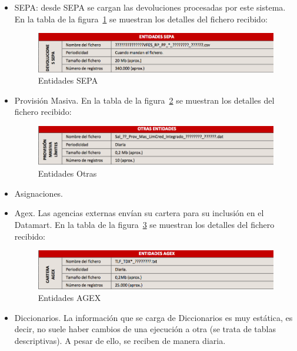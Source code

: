 \documentclass[a4paper, 12pt]{book}
\begin{document}
\begin{itemize}
	\item SEPA: desde SEPA se cargan las devoluciones procesadas por este sistema. En la tabla de la figura~\ref{fig:entidades9} se muestran los detalles del fichero recibido:

	\begin{figure}
	  \centering
	  \includegraphics[width=14cm, keepaspectratio]{img/entidades9}
	  \caption{Entidades SEPA}
	  \label{fig:entidades9}
	\end{figure}
	
	\item Provisión Masiva. En la tabla de la figura~\ref{fig:entidades10} se muestran los detalles del fichero recibido:

	\begin{figure}
	  \centering
	  \includegraphics[width=14cm, keepaspectratio]{img/entidades10}
	  \caption{Entidades Otras}
	  \label{fig:entidades10}
	\end{figure}
	
	\item Asignaciones.
	
	\item Agex. Las agencias externas envían su cartera para su inclusión en el Datamart. En la tabla de la figura~\ref{fig:entidades11} se muestran los detalles del fichero recibido:

	\begin{figure}
	  \centering
	  \includegraphics[width=14cm, keepaspectratio]{img/entidades11}
	  \caption{Entidades AGEX}
	  \label{fig:entidades11}
	\end{figure}
	
	\item Diccionarios. La información que se carga de Diccionarios es muy estática, es decir, no suele haber cambios de una ejecución a otra (se trata de tablas descriptivas). A pesar de ello, se reciben de manera diaria.
\end{itemize}
\end{document}
